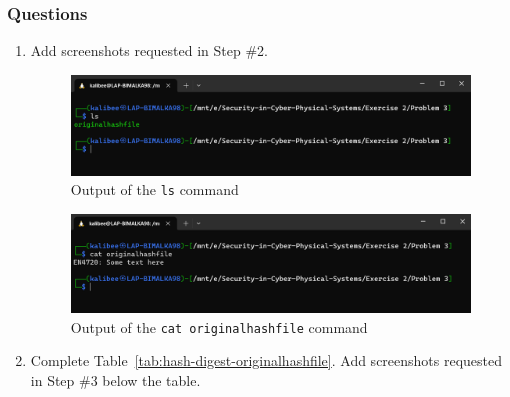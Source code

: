 \documentclass[11pt,letterpaper]{article}
\newenvironment{answer}{\em \color{blue} \begin{adjustwidth}{1cm}{1cm}}{\end{adjustwidth}}
\begin{document}
	\subsubsection*{Questions}
	\begin{enumerate}
		
		\item Add screenshots requested in Step \#2.
		
		\begin{answer}
			\begin{figure}[H]
				\centering
				\includegraphics[width=0.7\columnwidth]{images/p3/s1}
				\caption{Output of the {\tt ls} command} \label{fig:pa-ls}
			\end{figure}
		
			\begin{figure}[H]
				\centering
				\includegraphics[width=0.7\columnwidth]{images/p3/s2}
				\caption{Output of the {\tt cat originalhashfile} command} \label{fig:pa-cat}
			\end{figure}
		\end{answer}
		

		
		\item Complete Table~\ref{tab:hash-digest-originalhashfile}. Add screenshots requested in Step \#3 below the table.
		
				
				

\end{enumerate}
\end{document}
